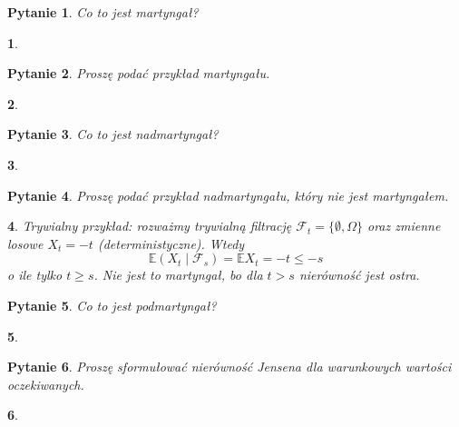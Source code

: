 \documentclass[10pt]{mwart}
\theoremstyle{plain}
\newtheorem{pytanie}{Pytanie}
\theoremstyle{break}
\newtheorem*{odpowiedź}{}
\begin{document}
\begin{pytanie}
Co to jest martyngał?
\end{pytanie}
\begin{odpowiedź}
\end{odpowiedź}


\begin{pytanie}
Proszę podać przykład martyngału.
\end{pytanie}
\begin{odpowiedź}
\end{odpowiedź}


\begin{pytanie}
Co to jest nadmartyngał?
\end{pytanie}
\begin{odpowiedź}
\end{odpowiedź}


\begin{pytanie}
Proszę podać przykład nadmartyngału, który nie jest martyngałem.
\end{pytanie}
\begin{odpowiedź}
    Trywialny przykład: rozważmy trywialną filtrację
    $\mathcal{F}_t = \{\emptyset, \Omega\}$ oraz zmienne losowe
    $X_t = -t$ (deterministyczne). Wtedy  \[
    \mathbb{E}(X_t\mid \mathcal{F}_s) = \mathbb{E}X_t = -t \leq -s
    \] 
    o ile tylko $t \geq s$. Nie jest to martyngał, bo dla $t > s$
    nierówność jest ostra.
\end{odpowiedź}


\begin{pytanie}
Co to jest podmartyngał?
\end{pytanie}
\begin{odpowiedź}
\end{odpowiedź}


\begin{pytanie}
Proszę sformułować nierówność Jensena dla warunkowych wartości oczekiwanych.
\end{pytanie}
\begin{odpowiedź}
\end{odpowiedź}
\end{document}
